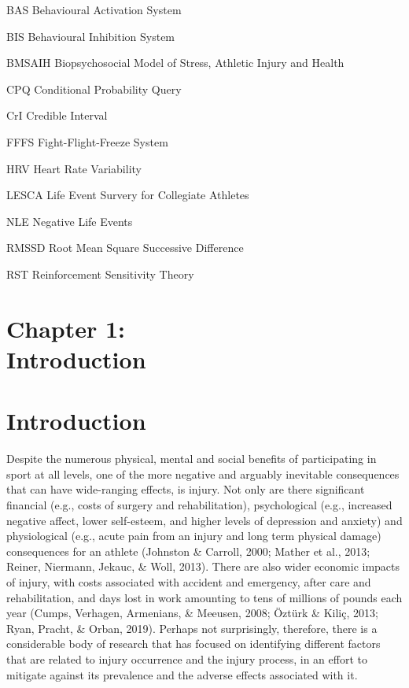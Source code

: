 \documentclass[
  english,
  man,floatsintext]{apa6}
\begin{document}
\begin{abbrv}
 
\item[BAS] Behavioural Activation System
\item[BIS] Behavioural Inhibition System
\item[BMSAIH] Biopsychosocial Model of Stress, Athletic Injury and Health
\item[CPQ] Conditional Probability Query
\item[CrI] Credible Interval
\item[FFFS] Fight-Flight-Freeze System
\item[HRV] Heart Rate Variability
\item[LESCA] Life Event Survery for Collegiate Athletes
\item[NLE] Negative Life Events
\item[RMSSD] Root Mean Square Successive Difference
\item[RST] Reinforcement Sensitivity Theory 
 
\end{abbrv}

\clearpage

\setcounter{page}{1}

\vspace*{3cm}

\section[Chapter 1: Introduction]{\Large{Chapter 1: \\ Introduction}}

\clearpage

\hypertarget{introduction}{%
\section{Introduction}\label{introduction}}

Despite the numerous physical, mental and social benefits of participating in sport at all levels, one of the more negative and arguably inevitable consequences that can have wide-ranging effects, is injury.
Not only are there significant financial (e.g., costs of surgery and rehabilitation), psychological (e.g., increased negative affect, lower self-esteem, and higher levels of depression and anxiety) and physiological (e.g., acute pain from an injury and long term physical damage) consequences for an athlete (Johnston \& Carroll, 2000; Mather et al., 2013; Reiner, Niermann, Jekauc, \& Woll, 2013).
There are also wider economic impacts of injury, with costs associated with accident and emergency, after care and rehabilitation, and days lost in work amounting to tens of millions of pounds each year (Cumps, Verhagen, Armenians, \& Meeusen, 2008; Öztürk \& Kiliç, 2013; Ryan, Pracht, \& Orban, 2019).
Perhaps not surprisingly, therefore, there is a considerable body of research that has focused on identifying different factors that are related to injury occurrence and the injury process, in an effort to mitigate against its prevalence and the adverse effects associated with it.
\end{document}
